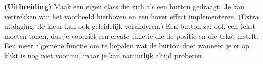 \textbf{(Uitbreiding) }Maak een eigen class die zich als een button gedraagt. Je kan vertrekken van het voorbeeld hierboven en een hover effect implementeren. (Extra uitdaging: de kleur kan ook geleidelijk veranderen.) Een button zal ook een tekst moeten tonen, dus je voorziet een create functie die de positie en die tekst instelt. Een meer algemene functie om te bepalen wat de button doet wanneer je er op klikt is nog niet voor nu, maar je kan natuurlijk altijd proberen.





